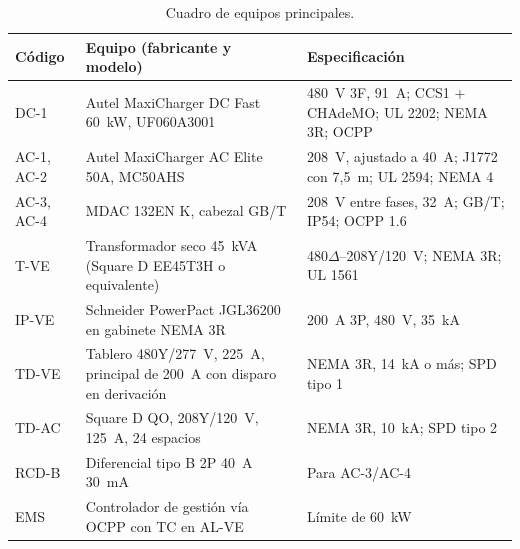 \begin{table}[H]
\centering\small
\caption{Cuadro de equipos principales.}\label{tab:equipos}
\begin{tabularx}{\textwidth}{L{1.5cm}L{4.5cm}Y}
\toprule
\textbf{Código} & \textbf{Equipo (fabricante y modelo)} & \textbf{Especificación}\\
\midrule
DC-1 & Autel MaxiCharger DC Fast 60~kW, UF060A3001 & 480~V 3F, 91~A; CCS1 + CHAdeMO; UL 2202; NEMA 3R; OCPP\\
AC-1, AC-2 & Autel MaxiCharger AC Elite 50A, MC50AHS & 208~V, ajustado a 40~A; J1772 con 7,5~m; UL 2594; NEMA 4\\
AC-3, AC-4 & MDAC 132EN K, cabezal GB/T & 208~V entre fases, 32~A; GB/T; IP54; OCPP 1.6\\
T-VE & Transformador seco 45~kVA (Square D EE45T3H o equivalente) & 480$\Delta$--208Y/120~V; NEMA 3R; UL 1561\\
IP-VE & Schneider PowerPact JGL36200 en gabinete NEMA 3R & 200~A 3P, 480~V, 35~kA\\
TD-VE & Tablero 480Y/277~V, 225~A, principal de 200~A con disparo en derivación & NEMA 3R, 14~kA o más; SPD tipo 1\\
TD-AC & Square D QO, 208Y/120~V, 125~A, 24 espacios & NEMA 3R, 10~kA; SPD tipo 2\\
RCD-B & Diferencial tipo B 2P 40~A 30~mA & Para AC-3/AC-4\\
EMS & Controlador de gestión vía OCPP con TC en AL-VE & Límite de 60~kW\\
\bottomrule
\end{tabularx}
\end{table}

